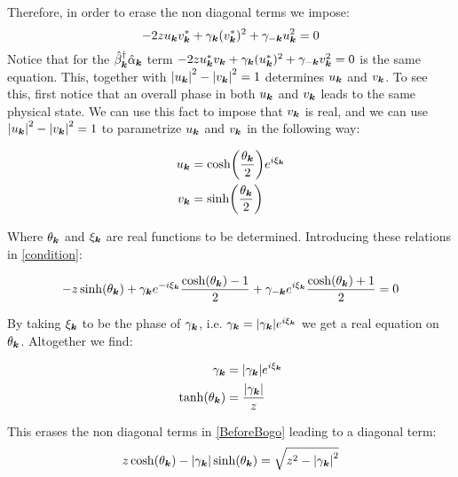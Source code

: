 Therefore, in order to erase the non diagonal terms we impose:
\begin{equation}
\label{condition}
-2zu_{\boldsymbol{k}}v_{\boldsymbol{k}}^* + \gamma_{\boldsymbol{k}}(v_{\boldsymbol{k}}^*)^2+\gamma_{-\boldsymbol{k}}u_{\boldsymbol{k}}^2 = 0
\end{equation}
Notice that for the $\hat{\beta}_{\boldsymbol{k}}^\dagger\hat{\alpha}_{\boldsymbol{k}}$ term $-2zu_{\boldsymbol{k}}^*v_{\boldsymbol{k}} + \gamma_{\boldsymbol{k}}(u_{\boldsymbol{k}}^*)^2+\gamma_{-\boldsymbol{k}}v_{\boldsymbol{k}}^2=0$ is the same equation. This, together with $\abs{u_{\boldsymbol{k}}}^2-\abs{v_{\boldsymbol{k}}}^2 = 1$ determines $u_{\boldsymbol{k}}$ and $v_{\boldsymbol{k}}$. To see this, first notice that an overall phase in both $u_{\boldsymbol{k}}$ and $v_{\boldsymbol{k}}$ leads to the same physical state. We can use this fact to impose that $v_{\boldsymbol{k}}$ is real, and we can use $\abs{u_{\boldsymbol{k}}}^2-\abs{v_{\boldsymbol{k}}}^2 = 1$ to parametrize $u_{\boldsymbol{k}}$ and $v_{\boldsymbol{k}}$ in the following way:

\begin{align*}
u_{\boldsymbol{k}} &= \cosh(\frac{\theta_{\boldsymbol{k}}}{2})e^{i \xi_{\boldsymbol{k}}} \\
v_{\boldsymbol{k}} &= \sinh(\frac{\theta_{\boldsymbol{k}}}{2})
\end{align*}

Where $\theta_{\boldsymbol{k}}$ and $\xi_{\boldsymbol{k}}$ are real functions to be determined. Introducing these relations in \ref{condition}:

\begin{equation}
- z\sinh(\theta_{\boldsymbol{k}}) +\gamma_{\boldsymbol{k}}e^{-i \xi_{\boldsymbol{k}}}\frac{ \cosh(\theta_{\boldsymbol{k}})-1}{2} +\gamma_{-\boldsymbol{k}}e^{i\xi_{\boldsymbol{k}}}\frac{ \cosh(\theta_{\boldsymbol{k}})+1}{2} = 0
\end{equation}

By taking $\xi_{\boldsymbol{k}}$ to be the phase of $\gamma_{\boldsymbol{k}}$, i.e. $\gamma_{\boldsymbol{k}} = \abs{\gamma_{\boldsymbol{k}}} e^{i\xi_{\boldsymbol{k}}}$ we get a real equation on $\theta_{\boldsymbol{k}}$. Altogether we find:

\begin{align}
\gamma_{\boldsymbol{k}} &= \abs{\gamma_{\boldsymbol{k}}} e^{i\xi_{\boldsymbol{k}}} \\
\tanh(\theta_{\boldsymbol{k}}) &= \frac{\abs{\gamma_{\boldsymbol{k}}}}{z}
\end{align}

This erases the non diagonal terms in \ref{BeforeBogo} leading to a diagonal term:
\begin{equation}
z\cosh(\theta_{\boldsymbol{k}})-\abs{\gamma_{\boldsymbol{k}}}\sinh(\theta_{\boldsymbol{k}}) = \sqrt{z^2-\abs{\gamma_{\boldsymbol{k}}}^2}
\end{equation}


